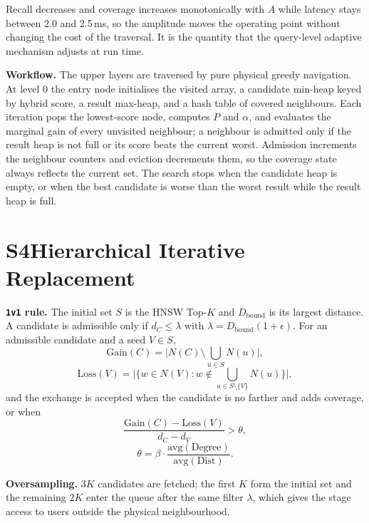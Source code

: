\documentclass[conference]{IEEEtran}
\begin{document}
Recall decreases and coverage increases monotonically with $A$ while latency
stays between 2.0 and 2.5\,ms, so the amplitude moves the operating point
without changing the cost of the traversal. It is the quantity that the
query-level adaptive mechanism adjusts at run time.

\textbf{Workflow.} The upper layers are traversed by pure physical greedy
navigation. At level $0$ the entry node initialises the visited array, a
candidate min-heap keyed by hybrid score, a result max-heap, and a hash table of
covered neighbours. Each iteration pops the lowest-score node, computes $P$ and
$\alpha$, and evaluates the marginal gain of every unvisited neighbour; a
neighbour is admitted only if the result heap is not full or its score beats the
current worst. Admission increments the neighbour counters and eviction
decrements them, so the coverage state always reflects the current set. The
search stops when the candidate heap is empty, or when the best candidate is
worse than the worst result while the result heap is full.

\section*{S4\quad Hierarchical Iterative Replacement}
\label{sec:s4}

\textbf{\texttt{1v1} rule.} The initial set $S$ is the HNSW Top-$K$ and
$D_{\text{bound}}$ is its largest distance. A candidate is admissible only if
$d_C\le\lambda$ with $\lambda=D_{\text{bound}}(1+\epsilon)$. For an admissible
candidate and a seed $V\in S$,
\begin{equation}
\text{Gain}(C)=\Big|N(C)\setminus\bigcup_{u\in S}N(u)\Big|,
\end{equation}
\begin{equation}
\text{Loss}(V)=\Big|\big\{w\in N(V):w\notin\bigcup_{u\in S\setminus\{V\}}N(u)\big\}\Big|,
\end{equation}
and the exchange is accepted when the candidate is no farther and adds coverage,
or when
\begin{equation}
\frac{\text{Gain}(C)-\text{Loss}(V)}{d_C-d_V}>\theta,
\end{equation}
\begin{equation}
\theta=\beta\cdot\frac{\mathrm{avg}(\text{Degree})}{\mathrm{avg}(\text{Dist})}.
\end{equation}

\textbf{Oversampling.} $3K$ candidates are fetched; the first $K$ form the
initial set and the remaining $2K$ enter the queue after the same filter
$\lambda$, which gives the stage access to users outside the physical
neighbourhood.
\end{document}
